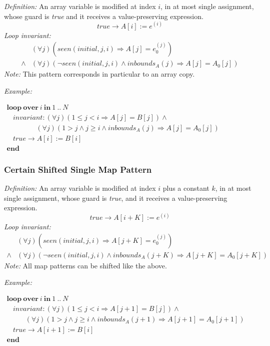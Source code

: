 \documentclass[a4paper,10pt]{article}
\newcommand{\idx}{\ensuremath{i}\xspace}
\newcommand{\idxinitial}{\ensuremath{\mathit{initial}}\xspace}
\newcommand{\KWloop}{\ensuremath{\mathrm{\textbf{loop}}~}}
\newcommand{\KWend}{\ensuremath{\mathrm{\textbf{end}}~}}
\newcommand{\KWover}{\ensuremath{\mathrm{\textbf{over}}~}}
\newcommand{\KWin}{\ensuremath{~\mathrm{\textbf{in}}~}}
\newcommand{\at}[1]{{(#1)}}
\newcommand{\impl}{\ensuremath{\Longrightarrow}}
\newcommand{\inbounds}[2]{\ensuremath{\mathit{inbounds}_{#1}(#2)}\xspace}
\newcommand{\seen}[3]{\ensuremath{\mathit{seen}{(#1,#2,#3)}}\xspace}
\newcommand{\loopinvariant}{\noindent\textit{Loop invariant:}\xspace}
\newcommand{\patterndef}{\noindent\textit{Definition:}\xspace}
\newcommand{\patternexample}{\noindent\textit{Example:}\xspace}
\newcommand{\patternnote}{\noindent\textit{Note:}\xspace}
\begin{document}
\patterndef An array variable is modified at index \idx, in at most single assignment, whose
guard is \textit{true} and it receives a value-preserving expression.
%
$$\mathit{true} \rightarrow A[\idx] := e^\at{\idx}$$
%
\loopinvariant
%
\begin{eqnarray*}
&(\forall j)(\seen{\idxinitial}{j}{\idx} \impl A[j] = e_0^\at{j}) \\
\land& (\forall j)(\neg \seen{\idxinitial}{j}{\idx} \land \inbounds{A}{j} \impl A[j] = A_0[j])
\end{eqnarray*}
%
\patternnote This pattern corresponds in particular to an array copy.

\bigskip
\patternexample

\medskip
$\begin{array}{l}
  \KWloop \KWover i \KWin 1~..~N \\
  ~~~~ \textit{invariant}: (\forall j)(1\leq j< i \impl A[j] = B[j]) \land\\
  ~~~~~~~~~~~~~~~~~~~ (\forall j)(1 > j \land j \geq i \land \inbounds{A}{j} \impl A[j] = A_0[j])\\
  ~~~~ true \rightarrow A[i] := B[i]\\
  \KWend
\end{array}$

\subsubsection*{Certain Shifted Single Map Pattern}

\patterndef An array variable is modified at index \idx plus a constant $k$, in at most single assignment, 
whose guard is \textit{true}, and it receives a value-preserving expression.
%
$$\mathit{true} \rightarrow A[\idx + K] := e^\at{\idx}$$
%
\loopinvariant
%
\begin{eqnarray*}
&(\forall j)(\seen{\idxinitial}{j}{\idx} \impl A[j + K] = e_0^\at{j}) \\
\land& (\forall j)(\neg \seen{\idxinitial}{j}{\idx} \land \inbounds{A}{j + K} \impl A[j + K] = A_0[j + K])
\end{eqnarray*}
%
\patternnote All map patterns can be shifted like the above.

\bigskip
\patternexample

\medskip
$\begin{array}{l}
  \KWloop \KWover i \KWin 1~..~N \\
  ~~~~ \textit{invariant}: (\forall j)(1 \leq j < i \impl A[j+1] = B[j]) \land\\
  ~~~~~~~~~~~~ (\forall j)(1 > j \land j \geq i \land \inbounds{A}{j+1} \impl A[j+1] = A_0[j+1])\\
  ~~~~ true \rightarrow A[i+1] := B[i]\\
  \KWend
\end{array}$
\end{document}

